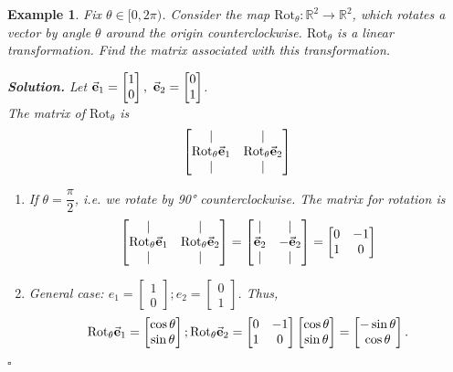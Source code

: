 \documentclass[12pt, a4paper]{article}
\newtheorem{eg}{Example}[subsection]
\newenvironment*{sol}{\par\indent\textbf{\textit{Solution. }}}{\hfill{$\square$}\par}
\def\R{{\mathbb{R}}}
\def\vece{\va{e}}
\begin{document}
\begin{eg}
Fix $\theta \in [0, 2\pi )$. Consider the map $\text{Rot}_\theta: \R^2 \rightarrow\R^2$, which rotates a vector by angle $\theta$ around the origin counterclockwise. $\text{Rot}_\theta$ is a linear transformation. Find the matrix associated with this transformation.\\
\begin{sol}
Let $\vece_1=\begin{bmatrix}1\\0\end{bmatrix},\ \vece_2=\begin{bmatrix}0\\1\end{bmatrix}$. \\
The matrix of $\text{Rot}_\theta$ is 
$$\begin{bmatrix}|&|\\ \text{Rot}_{\theta}\vece_1& \text{Rot}_{\theta}\vece_2\\|&|\end{bmatrix}$$
\begin{enumerate}
\item If $\theta = \dfrac{\pi}{2}$, i.e. we rotate by 90° counterclockwise. The matrix for rotation is $$\begin{bmatrix}|&|\\ \text{Rot}_{\theta}\vece_1& \text{Rot}_{\theta}\vece_2\\|&|\end{bmatrix}=\begin{bmatrix}|&|\\ \vece_2& -\vece_2\\|&|\end{bmatrix}=\begin{bmatrix}0&-1\\1&0\end{bmatrix}$$
\item General case: 
$e_1=\begin{bmatrix}1\\0\end{bmatrix};e_2=\begin{bmatrix}0\\1\end{bmatrix}$. Thus, $$\text{Rot}_{\theta}\vece_1=\begin{bmatrix}\cos{\theta}\\\sin{\theta}\end{bmatrix};\text{Rot}_{\theta}\vece_2=\begin{bmatrix}0&-1\\1&0\end{bmatrix}\begin{bmatrix}\cos{\theta}\\\sin{\theta}\end{bmatrix}=\begin{bmatrix}-\sin{\theta}\\\cos{\theta}\end{bmatrix}.$$

\end{enumerate}
\end{sol}
\end{eg}
\end{document}
